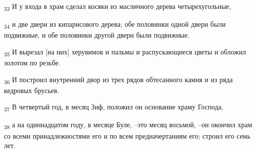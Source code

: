 \begin{tcolorbox}
\textsubscript{33} И у входа в храм сделал косяки из масличного дерева четырехугольные,
\end{tcolorbox}
\begin{tcolorbox}
\textsubscript{34} и две двери из кипарисового дерева; обе половинки одной двери были подвижные, и обе половинки другой двери были подвижные.
\end{tcolorbox}
\begin{tcolorbox}
\textsubscript{35} И вырезал [на них] херувимов и пальмы и распускающиеся цветы и обложил золотом по резьбе.
\end{tcolorbox}
\begin{tcolorbox}
\textsubscript{36} И построил внутренний двор из трех рядов обтесанного камня и из ряда кедровых брусьев.
\end{tcolorbox}
\begin{tcolorbox}
\textsubscript{37} В четвертый год, в месяц Зиф, положил он основание храму Господа,
\end{tcolorbox}
\begin{tcolorbox}
\textsubscript{38} а на одиннадцатом году, в месяце Буле, --это месяц восьмой, --он окончил храм со всеми принадлежностями его и по всем предначертаниям его; строил его семь лет.
\end{tcolorbox}
